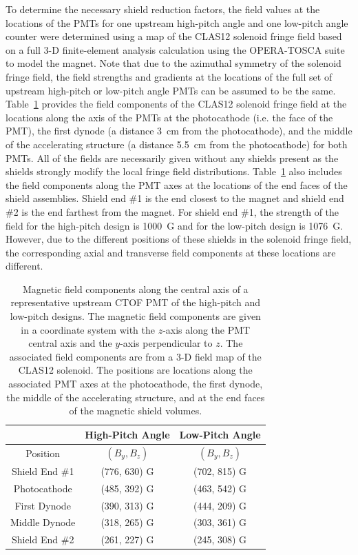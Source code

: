 \documentclass[3p,times,twocolumn]{elsarticle}
\begin{document}
To determine the necessary shield reduction factors, the field values at the locations of the PMTs for one
upstream high-pitch angle and one low-pitch angle counter were determined using a map of the CLAS12 solenoid
fringe field based on a full 3-D finite-element analysis calculation using the OPERA-TOSCA suite to model the
magnet. Note that due to the azimuthal symmetry of the solenoid fringe field, the field strengths and gradients
at the locations of the full set of upstream high-pitch or low-pitch angle PMTs can be assumed to be the same.
Table~\ref{field-position} provides the field components of the CLAS12 solenoid fringe field at the locations
along the axis of the PMTs at the photocathode (i.e. the face of the PMT), the first dynode (a distance 3~cm
from the photocathode), and the middle of the accelerating structure (a distance 5.5~cm from the photocathode)
for both PMTs. All of the fields are necessarily given without any shields present as the shields strongly modify
the local fringe field distributions. Table~\ref{field-position} also includes the field components along the PMT
axes at the locations of the end faces of the shield assemblies. Shield end \#1 is the end closest to the magnet
and shield end \#2 is the end farthest from the magnet. For shield end \#1, the strength of the field for the
high-pitch design is 1000~G and for the low-pitch design is 1076~G. However, due to the different positions of
these shields in the solenoid fringe field, the corresponding axial and transverse field components at these
locations are different.

\begin{table}[htbp]
\begin{center}
\begin{tabular} {|c|c|c|} \hline
               & High-Pitch Angle & Low-Pitch Angle \\ \hline
Position       & $(B_y,B_z)$      & $(B_y,B_z)$  \\ \hline
Shield End \#1 & (776, 630) G   & (702, 815) G \\ \hline
Photocathode   & (485, 392) G    & (463, 542) G \\ \hline
First Dynode   & (390, 313) G     & (444, 209) G \\ \hline
Middle Dynode  & (318, 265) G   & (303, 361) G \\ \hline
Shield End \#2 & (261, 227) G   & (245, 308) G \\ \hline \hline
\end{tabular}
\end{center}
\caption{Magnetic field components along the central axis of a representative upstream CTOF PMT of the
high-pitch and low-pitch designs. The magnetic field components are given in a coordinate system with the
$z$-axis along the PMT central axis and the $y$-axis perpendicular to $z$. The associated field components
are from a 3-D field map of the CLAS12 solenoid. The positions are locations along the associated PMT axes
at the photocathode, the first dynode, the middle of the accelerating structure, and at the end faces of the
magnetic shield volumes.}
\label{field-position}
\end{table}
\end{document}
